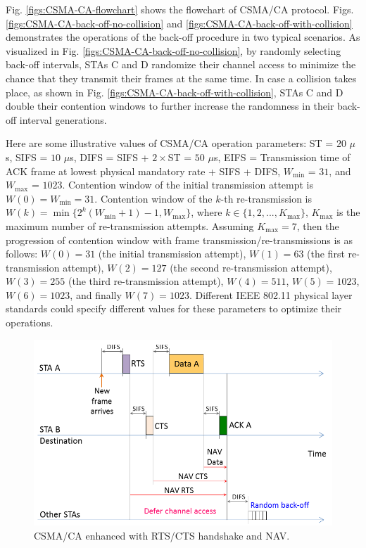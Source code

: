 Fig. \ref{figs:CSMA-CA-flowchart} shows the flowchart of CSMA/CA protocol. Figs. \ref{figs:CSMA-CA-back-off-no-collision} and \ref{figs:CSMA-CA-back-off-with-collision} demonstrates the operations of the back-off procedure in two typical scenarios. As visualized in Fig. \ref{figs:CSMA-CA-back-off-no-collision}, by randomly selecting back-off intervals, STAs C and D randomize their channel access to minimize the chance that they transmit their frames at the same time. In case a collision takes place, as shown in Fig. \ref{figs:CSMA-CA-back-off-with-collision}, STAs C and D double their contention windows to further increase the randomness in their back-off interval generations.

Here are some illustrative values of CSMA/CA operation parameters: ST = $20$ $\mu$s, SIFS = $10$ $\mu$s, DIFS = SIFS + $2\times$ST = $50$ $\mu$s, EIFS = Transmission time of ACK frame at lowest physical mandatory rate + SIFS + DIFS, $W_{\min}$ = $31$, and $W_{\max}$ = $1023$. Contention window of the initial transmission attempt is $W(0)=W_{\min}=31$. Contention window of the $k$-th re-transmission is $W(k)=\min\{2^{k}(W_{\min}+1)-1, W_{\max}\}$, where $k \in \{1,2, ..., K_{\max}\}$, $K_{\max}$ is the maximum number of re-transmission attempts. Assuming $K_{\max}=7$, then the progression of contention window with frame transmission/re-transmissions is as follows: $W(0)=31$ (the initial transmission attempt), $W(1)=63$ (the first re-transmission attempt), $W(2)=127$ (the second re-transmission attempt), $W(3)=255$ (the third re-transmission attempt), $W(4)=511$, $W(5)=1023$, $W(6)=1023$, and finally $W(7)=1023$. Different IEEE 802.11 physical layer standards could specify different values for these parameters to optimize their operations.

\begin{figure}[!t]
	\centering
	\includegraphics[width=0.65\columnwidth]{figs/802-11-RTS-CTS-NAV}
	\caption{CSMA/CA enhanced with RTS/CTS handshake and NAV.}
	\label{figs:802-11-RTS-CTS-NAV}
\end{figure}

